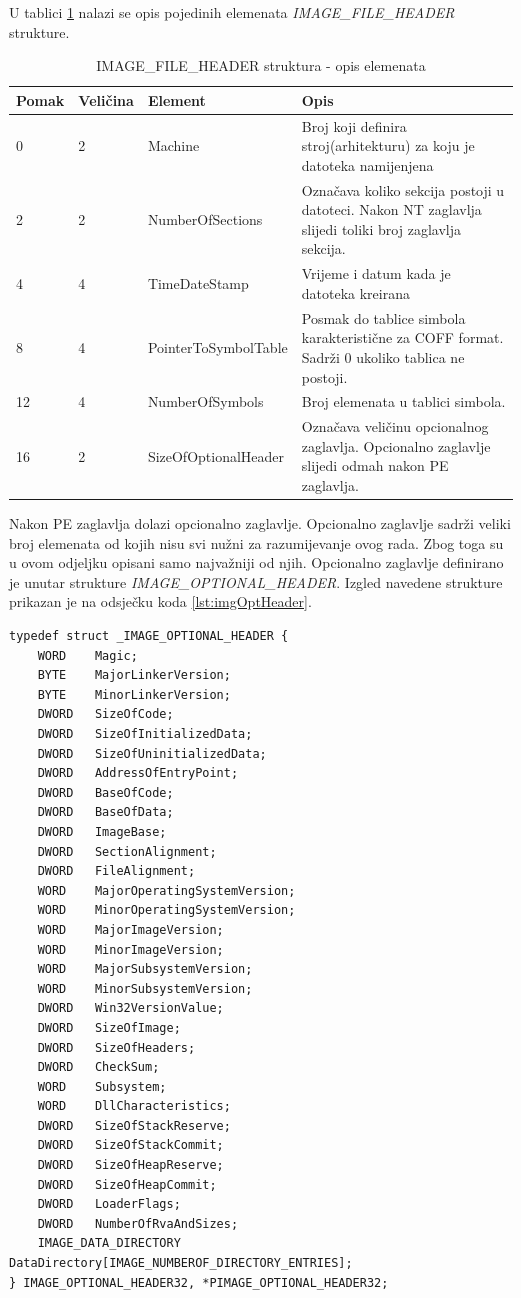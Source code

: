 \documentclass[times, utf8, diplomski, numeric]{fer}
\begin{document}
U tablici \ref{tbl:imgFileHdr} nalazi se opis pojedinih elemenata
\emph{IMAGE\_FILE\_HEADER} strukture.

\pagebreak

\begin{table}[htb]
\small
\caption{IMAGE\_FILE\_HEADER struktura - opis elemenata}
\label{tbl:imgFileHdr}
\centering
\begin{tabular}{|l|l|l|p{6cm}|}
\hline
Pomak & Veličina & Element & Opis \\ \hline
0 & 2 & Machine & Broj koji definira stroj(arhitekturu) za koju je datoteka namijenjena \\ \hline
2 & 2 & NumberOfSections & Označava koliko sekcija postoji u datoteci. Nakon NT zaglavlja slijedi toliki broj zaglavlja sekcija. \\ \hline
4 & 4 & TimeDateStamp & Vrijeme i datum kada je datoteka kreirana \\ \hline
8 & 4 & PointerToSymbolTable & Posmak do tablice simbola karakteristične za COFF format. Sadrži 0 ukoliko tablica ne postoji. \\ \hline
12 & 4 & NumberOfSymbols & Broj elemenata u tablici simbola. \\ \hline
16 & 2 & SizeOfOptionalHeader & Označava veličinu opcionalnog zaglavlja. Opcionalno zaglavlje slijedi odmah nakon PE zaglavlja. \\ \hline
\end{tabular}
\end{table}

Nakon PE zaglavlja dolazi opcionalno zaglavlje. Opcionalno
zaglavlje sadrži veliki broj elemenata od kojih nisu svi nužni za
razumijevanje ovog rada. Zbog toga su u ovom odjeljku opisani
samo najvažniji od njih. Opcionalno zaglavlje definirano je
unutar strukture \emph{IMAGE\_OPTIONAL\_HEADER}. Izgled navedene
strukture prikazan je na odsječku koda \ref{lst:imgOptHeader}.


\begin{lstlisting}[frame=single, caption=IMAGE\_OPTIONAL\_HEADER struktura, label={lst:imgOptHeader}]
typedef struct _IMAGE_OPTIONAL_HEADER {
	WORD    Magic;
	BYTE    MajorLinkerVersion;
	BYTE    MinorLinkerVersion;
	DWORD   SizeOfCode;
	DWORD   SizeOfInitializedData;
	DWORD   SizeOfUninitializedData;
	DWORD   AddressOfEntryPoint;
	DWORD   BaseOfCode;
	DWORD   BaseOfData;
	DWORD   ImageBase;
	DWORD   SectionAlignment;
	DWORD   FileAlignment;
	WORD    MajorOperatingSystemVersion;
	WORD    MinorOperatingSystemVersion;
	WORD    MajorImageVersion;
	WORD    MinorImageVersion;
	WORD    MajorSubsystemVersion;
	WORD    MinorSubsystemVersion;
	DWORD   Win32VersionValue;
	DWORD   SizeOfImage;
	DWORD   SizeOfHeaders;
	DWORD   CheckSum;
	WORD    Subsystem;
	WORD    DllCharacteristics;
	DWORD   SizeOfStackReserve;
	DWORD   SizeOfStackCommit;
	DWORD   SizeOfHeapReserve;
	DWORD   SizeOfHeapCommit;
	DWORD   LoaderFlags;
	DWORD   NumberOfRvaAndSizes;
	IMAGE_DATA_DIRECTORY DataDirectory[IMAGE_NUMBEROF_DIRECTORY_ENTRIES];
} IMAGE_OPTIONAL_HEADER32, *PIMAGE_OPTIONAL_HEADER32;
\end{lstlisting}
\end{document}
